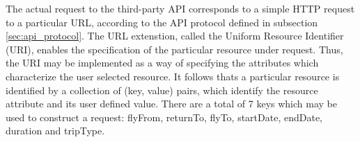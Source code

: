The actual request to the third-party API corresponds to a simple HTTP request to a particular URL,
according to the API protocol defined in subsection \ref{sec:api_protocol}. The URL extenstion, called 
the Uniform Resource Identifier (URI), enables the specification of the particular resource under request.
Thus, the URI may be implemented as a way of specifying the attributes which characterize the user selected resource.
It follows thats a particular resource is identified by a collection of (key, value) pairs,
which identify the resource attribute and its user defined value.
There are a total of 7 keys which may be used to construct a request: flyFrom, returnTo, flyTo, startDate, endDate, duration and tripType.

